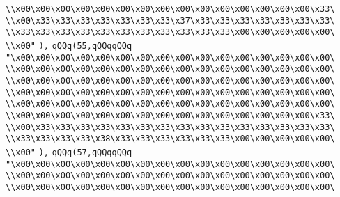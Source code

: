\verb|\\x00\x00\x00\x00\x00\x00\x00\x00\x00\x00\x00\x00\x00\x00\x00\x33\|\newline
\verb|\\x00\x33\x33\x33\x33\x33\x33\x33\x37\x33\x33\x33\x33\x33\x33\x33\|\newline
\verb|\\x33\x33\x33\x33\x33\x33\x33\x33\x33\x33\x33\x00\x00\x00\x00\x00\|\newline
\verb|\\x00"|\newline
\verb|),|\newline
\verb|qQQq(55,qQQqqQQq|\newline
\verb|"\x00\x00\x00\x00\x00\x00\x00\x00\x00\x00\x00\x00\x00\x00\x00\x00\|\newline
\verb|\\x00\x00\x00\x00\x00\x00\x00\x00\x00\x00\x00\x00\x00\x00\x00\x00\|\newline
\verb|\\x00\x00\x00\x00\x00\x00\x00\x00\x00\x00\x00\x00\x00\x00\x00\x00\|\newline
\verb|\\x00\x00\x00\x00\x00\x00\x00\x00\x00\x00\x00\x00\x00\x00\x00\x00\|\newline
\verb|\\x00\x00\x00\x00\x00\x00\x00\x00\x00\x00\x00\x00\x00\x00\x00\x00\|\newline
\verb|\\x00\x00\x00\x00\x00\x00\x00\x00\x00\x00\x00\x00\x00\x00\x00\x33\|\newline
\verb|\\x00\x33\x33\x33\x33\x33\x33\x33\x33\x33\x33\x33\x33\x33\x33\x33\|\newline
\verb|\\x33\x33\x33\x33\x38\x33\x33\x33\x33\x33\x33\x00\x00\x00\x00\x00\|\newline
\verb|\\x00"|\newline
\verb|),|\newline
\verb|qQQq(57,qQQqqQQq|\newline
\verb|"\x00\x00\x00\x00\x00\x00\x00\x00\x00\x00\x00\x00\x00\x00\x00\x00\|\newline
\verb|\\x00\x00\x00\x00\x00\x00\x00\x00\x00\x00\x00\x00\x00\x00\x00\x00\|\newline
\verb|\\x00\x00\x00\x00\x00\x00\x00\x00\x00\x00\x00\x00\x00\x00\x00\x00\|\newline
